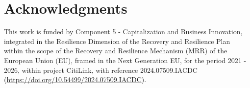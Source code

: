 \documentclass[11pt]{article}
\begin{document}
\section*{Acknowledgments}

This work is funded by Component 5 - Capitalization and Business Innovation, integrated in the Resilience Dimension of the Recovery and Resilience Plan within the scope of the Recovery and Resilience Mechanism (MRR) of the European Union (EU), framed in the Next Generation EU, for the period 2021 - 2026, within project CitiLink, with reference 2024.07509.IACDC (\url{https://doi.org/10.54499/2024.07509.IACDC}).

%



\end{document}
